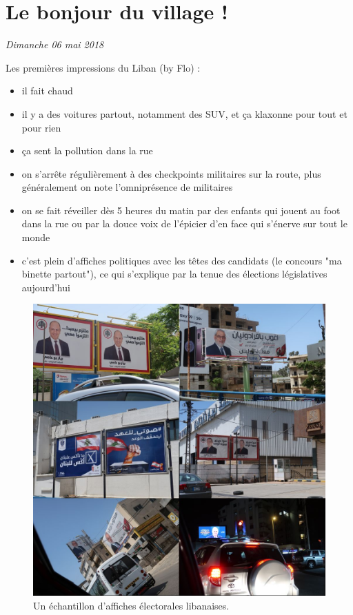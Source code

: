 \hypertarget{le-bonjour-du-village}{%
\section{Le bonjour du village !}\label{le-bonjour-du-village}}

\emph{Dimanche 06 mai 2018}

Les premières impressions du Liban (by Flo) :

\begin{itemize}
\tightlist
\item
  il fait chaud
\item
  il y a des voitures partout, notamment des SUV, et ça klaxonne pour
  tout et pour rien
\item
  ça sent la pollution dans la rue
\item
  on s'arrête régulièrement à des checkpoints militaires sur la route,
  plus généralement on note l'omniprésence de militaires
\item
  on se fait réveiller dès 5 heures du matin par des enfants qui jouent
  au foot dans la rue ou par la douce voix de l'épicier d'en face qui
  s'énerve sur tout le monde
\item
  c'est plein d'affiches politiques avec les têtes des candidats (le
  concours "ma binette partout"), ce qui s'explique par la tenue des
  élections législatives aujourd'hui
\end{itemize}

\begin{figure}
\centering
\includegraphics{images/20180506_politique.jpg}
\caption{Un échantillon d'affiches électorales libanaises.}
\end{figure}

